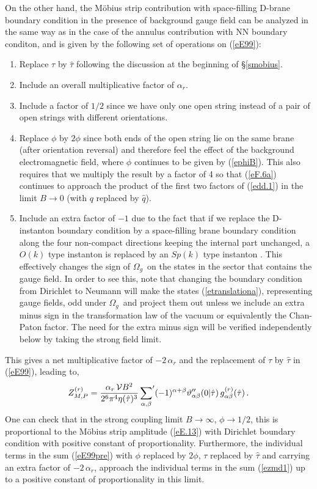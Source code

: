 \documentclass[12pt,a4paper]{article}
\newcommand{\be}{\begin{equation}}
\newcommand{\ee}{\end{equation}}
\newcommand{\refb}[1]{(\ref{#1})}
\newcommand{\vt}{\vartheta}
\newcommand{\VV}{{\cal V}}
\def\gr{g^{(r)}}
\def\Zr{Z^{(r)}}
\def\htau{\hat\tau}
\newcommand{\oo}{{$\Omega_g$}}
\begin{document}
On the other hand, the M\"{o}bius strip contribution with
space-filling D-brane boundary condition in the presence of background gauge
field can be analyzed in the same way as in the case of the annulus contribution with NN boundary
conditon, and is given by the  following set of operations on \refb{eE99}:
\begin{enumerate}
\item
Replace $\tau$ by $\htau$ following the discussion at the beginning of \S\ref{smobius}.

\item
Include an overall multiplicative factor of $\alpha_r$.

\item
Include a factor of $1/2$ since we have only one open string instead of
a pair of open strings with different orientations.

\item
Replace $\phi$ by $2\phi$ since both ends of the open string lie
on the same brane (after orientation reversal) and therefore feel the effect of the
background electromagnetic field, where $\phi$ continues to be given by \refb{ephiB}.
This also requires that we multiply the result by a factor of 4 so that \refb{eF.6a}
continues to approach the product of the first two factors of \refb{edd.1} in the
limit $B\to 0$ (with $q$ replaced by $\hat q$).

\item
Include an extra factor of $-1$ due to the fact that if we replace the D-instanton
boundary condition by a space-filling brane boundary condition along the four non-compact directions keeping the
internal part unchanged, a $O(k)$ type instanton is replaced by an $Sp(k)$ type
instanton \cite{Gimon:1996rq}.
This effectively changes the sign of \oo\ on the states in the sector
that contains the gauge field. In order to see this, note that changing the boundary
condition from Dirichlet to Neumann will make the states \refb{etranslationa},
representing gauge fields, odd under \oo\ and project them out unless we include an extra minus sign in the
transformation law of the vacuum or equivalently the Chan-Paton factor.
The need for the extra minus sign will be
verified independently below by taking the strong field limit.
\end{enumerate}
This gives a net multiplicative factor of $-2\,\alpha_r$ and the replacement of $\tau$ by
$\hat\tau$ in \refb{eE99}, leading to,
\be\label{emobelec}
\Zr_{M,P}= \frac{\alpha_r\,\VV B^2 }{2^{6} \pi^{4}\eta(\htau)^{3}} \,
{\sum_{\alpha,\beta}}' (-1)^{\alpha+\beta}
\vt''_{\alpha\beta}(0|\htau)  \,\gr_{\alpha\beta}(\htau)\, .
\ee
One can check that in the strong coupling limit $B\to\infty$,
$\phi\to 1/2$, this is proportional to the M\"{o}bius strip
amplitude \refb{eE.13} with Dirichlet boundary condition with positive
constant of proportionality. Furthermore, the individual terms in the sum
\refb{eE99pre} with $\phi$ replaced by $2\phi$, $\tau$ replaced by
$\htau$ and carrying an extra factor of $-2\,\alpha_r$,
approach the individual terms in the sum \refb{ezmd1} up to a positive constant
of proportionality in this limit.
\end{document}
